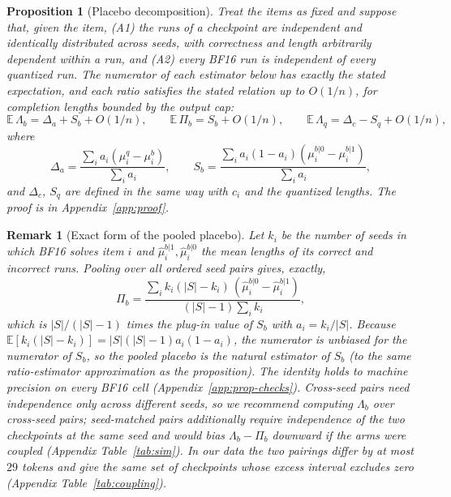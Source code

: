 \documentclass[11pt,a4paper]{article}
\newtheorem{proposition}{Proposition}
\newtheorem{remark}{Remark}
\begin{document}
\begin{proposition}[Placebo decomposition]
\label{prop:placebo}
Treat the items as fixed and suppose that, given the item, (A1) the runs of a checkpoint are independent and identically distributed across seeds, with correctness and length arbitrarily dependent within a run, and (A2) every BF16 run is independent of every quantized run. The numerator of each estimator below has exactly the stated expectation, and each ratio satisfies the stated relation up to $O(1/n)$, for completion lengths bounded by the output cap:
\begin{equation}
\mathbb{E}\,\Lambda_b = \Delta_a + S_b + O(1/n),\qquad \mathbb{E}\,\Pi_b = S_b + O(1/n),\qquad \mathbb{E}\,\Lambda_q = \Delta_c - S_q + O(1/n),
\end{equation}
where
\begin{equation}
\Delta_a=\frac{\sum_i a_i(\mu^q_i-\mu^b_i)}{\sum_i a_i},\qquad
S_b=\frac{\sum_i a_i(1-a_i)(\mu^{b|0}_i-\mu^{b|1}_i)}{\sum_i a_i},
\end{equation}
and $\Delta_c$, $S_q$ are defined in the same way with $c_i$ and the quantized lengths. The proof is in Appendix~\ref{app:proof}.
\end{proposition}

\begin{remark}[Exact form of the pooled placebo]
\label{rem:exact}
Let $k_i$ be the number of seeds in which BF16 solves item $i$ and $\hat\mu^{b|1}_i,\hat\mu^{b|0}_i$ the mean lengths of its correct and incorrect runs. Pooling over all ordered seed pairs gives, exactly,
\[
\Pi_b=\frac{\sum_i k_i(|S|-k_i)\,(\hat\mu^{b|0}_i-\hat\mu^{b|1}_i)}{(|S|-1)\sum_i k_i},
\]
which is $|S|/(|S|-1)$ times the plug-in value of $S_b$ with $a_i=k_i/|S|$. Because $\mathbb{E}[k_i(|S|-k_i)]=|S|(|S|-1)a_i(1-a_i)$, the numerator is unbiased for the numerator of $S_b$, so the pooled placebo is the natural estimator of $S_b$ (to the same ratio-estimator approximation as the proposition). The identity holds to machine precision on every BF16 cell (Appendix~\ref{app:prop-checks}). Cross-seed pairs need independence only across different seeds, so we recommend computing $\Lambda_b$ over cross-seed pairs; seed-matched pairs additionally require independence of the two checkpoints at the same seed and would bias $\Lambda_b-\Pi_b$ downward if the arms were coupled (Appendix Table~\ref{tab:sim}). In our data the two pairings differ by at most $29$ tokens and give the same set of checkpoints whose excess interval excludes zero (Appendix Table~\ref{tab:coupling}).
\end{remark}
\end{document}

